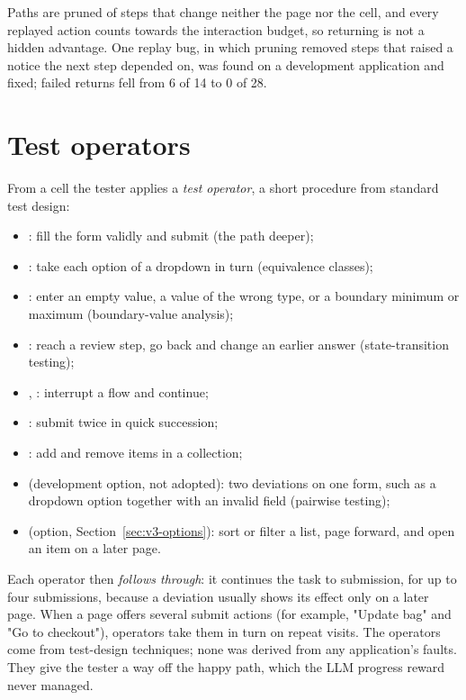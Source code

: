 Paths are pruned of steps that change neither the page nor the cell, and every replayed
action counts towards the interaction budget, so returning is not a hidden advantage. One
replay bug, in which pruning removed steps that raised a notice the next step depended on,
was found on a development application and fixed; failed returns fell from 6 of 14 to 0 of
28.

\section{Test operators}
\label{sec:operators}

From a cell the tester applies a \emph{test operator}, a short procedure from standard test
design:

\begin{itemize}[noitemsep]
  \item {}: fill the form validly and submit (the path deeper);
  \item {}: take each option of a dropdown in turn (equivalence classes);
  \item {}: enter an empty value, a value of the wrong type, or a boundary
        minimum or maximum (boundary-value analysis);
  \item {}: reach a review step, go back and change an earlier
        answer (state-transition testing);
  \item {}, : interrupt a flow and continue;
  \item {}: submit twice in quick succession;
  \item {}: add and remove items in a collection;
  \item {} (development option, not adopted): two deviations on one form, such
        as a dropdown option together with an invalid field (pairwise testing);
  \item {} (option, Section~\ref{sec:v3-options}): sort or filter a list,
        page forward, and open an item on a later page.
\end{itemize}

Each operator then \emph{follows through}: it continues the task to submission, for up to
four submissions, because a deviation usually shows its effect only on a later page. When a
page offers several submit actions (for example, "Update bag" and "Go to checkout"),
operators take them in turn on repeat visits. The operators come from test-design
techniques; none was derived from any application's faults. They give the tester a way off
the happy path, which the LLM progress reward never managed.

